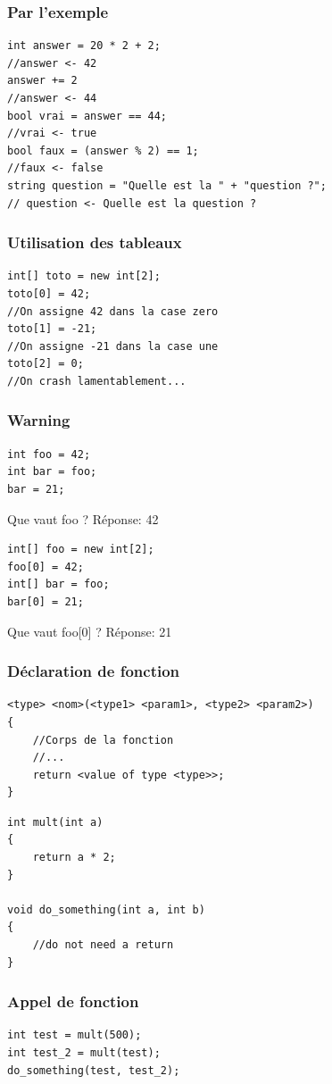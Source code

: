 \documentclass{beamer}
\begin{document}
\begin{frame}[fragile]
\frametitle{Par l'exemple}
\begin{center}
\begin{lstlisting}
int answer = 20 * 2 + 2;
//answer <- 42
answer += 2
//answer <- 44
bool vrai = answer == 44;
//vrai <- true
bool faux = (answer % 2) == 1;
//faux <- false
string question = "Quelle est la " + "question ?";
// question <- Quelle est la question ?
\end{lstlisting}
\end{center}
\end{frame}

\begin{frame}[fragile]
\frametitle{Utilisation des tableaux}
\begin{center}
\begin{lstlisting}
int[] toto = new int[2];
toto[0] = 42;
//On assigne 42 dans la case zero
toto[1] = -21;
//On assigne -21 dans la case une
toto[2] = 0;
//On crash lamentablement...
\end{lstlisting}
\end{center}
\end{frame}

\begin{frame}[fragile]
\frametitle{Warning}
\begin{lstlisting}
int foo = 42;
int bar = foo;
bar = 21;
\end{lstlisting}
Que vaut foo ?
\pause
Réponse: 42
\pause
\begin{lstlisting}
int[] foo = new int[2];
foo[0] = 42;
int[] bar = foo;
bar[0] = 21;
\end{lstlisting}
Que vaut foo[0] ?
\pause
Réponse: 21
\end{frame}

\begin{frame}[fragile]
\frametitle{Déclaration de fonction}
\begin{lstlisting}
<type> <nom>(<type1> <param1>, <type2> <param2>)
{
    //Corps de la fonction
    //...
    return <value of type <type>>;
}
\end{lstlisting}
\pause
\begin{lstlisting}
int mult(int a)
{
    return a * 2;
}

void do_something(int a, int b)
{
    //do not need a return
}
\end{lstlisting}
\end{frame}

\begin{frame}[fragile]
\frametitle{Appel de fonction}
\begin{lstlisting}
int test = mult(500);
int test_2 = mult(test);
do_something(test, test_2);
\end{lstlisting}
\end{frame}
\end{document}
